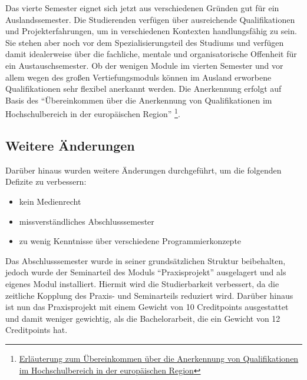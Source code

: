 Das vierte Semester eignet sich jetzt aus verschiedenen Gründen gut für
ein Auslandssemester. Die Studierenden verfügen über ausreichende
Qualifikationen und Projekterfahrungen, um in verschiedenen Kontexten
handlungsfähig zu sein. Sie stehen aber noch vor dem
Spezialisierungsteil des Studiums und verfügen damit idealerweise über
die fachliche, mentale und organisatorische Offenheit für ein
Austauschsemester. Ob der wenigen Module im vierten Semester und vor
allem wegen des großen Vertiefungsmoduls können im Ausland erworbene
Qualifikationen sehr flexibel anerkannt werden. Die Anerkennung erfolgt
auf Basis des ``Übereinkommen über die Anerkennung von Qualifikationen
im Hochschulbereich in der europäischen Region'' \footnote{\href{https://de.wikipedia.org/wiki/\%C3\%9Cbereinkommen_\%C3\%BCber_die_Anerkennung_von_Qualifikationen_im_Hochschulbereich_in_der_europ\%C3\%A4ischen_Region}{Erläuterung
  zum Übereinkommen über die Anerkennung von Qualifikationen im
  Hochschulbereich in der europäischen Region}}.

\subsection{Weitere
Änderungen\label{/mi-2017/selbstbericht/0150-soll-zustand-geplante-veraenderungen/0000-geplante-veraenderungen-bachelor}}\label{weitere-uxe4nderungenpathlabelmi-2017selbstbericht0150-soll-zustand-geplante-veraenderungen0000-geplante-veraenderungen-bachelor}

Darüber hinaus wurden weitere Änderungen durchgeführt, um die folgenden
Defizite zu verbessern:

\begin{itemize}
\tightlist
\item
  kein Medienrecht
\item
  missverständliches Abschlusssemester
\item
  zu wenig Kenntnisse über verschiedene Programmierkonzepte
\end{itemize}

Das Abschlusssemester wurde in seiner grundsätzlichen Struktur
beibehalten, jedoch wurde der Seminarteil des Moduls ``Praxisprojekt''
ausgelagert und als eigenes Modul installiert. Hiermit wird die
Studierbarkeit verbessert, da die zeitliche Kopplung des Praxis- und
Seminarteils reduziert wird. Darüber hinaus ist nun das Praxisprojekt
mit einem Gewicht von 10 Creditpoints ausgestattet und damit weniger
gewichtig, als die Bachelorarbeit, die ein Gewicht von 12 Creditpoints
hat.

